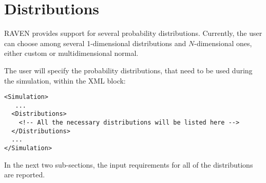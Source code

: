 \section{Distributions}
\label{sec:distributions}
\newcommand{\distname}[1]{\textbf{#1}}
\newcommand{\distattrib}[1]{\textit{#1}}

\newcommand{\nameDescription}{\xmlAttr{name},
  \xmlDesc{required string attribute}, user-defined name of this distribution.
  \nb As with other objects, this identifier can be used to reference this
  specific entity from other input blocks in the XML.}
\newcommand{\specBlock}[2]{The specifications of this distribution must be
  defined within #1 \xmlNode{#2} XML block.}
\newcommand{\attrIntro}{This XML node accepts one attribute:}
\newcommand{\attrsIntro}{This XML node accepts the following attributes:}
\newcommand{\subnodeIntro}{This distribution can be initialized with the
  following child node:}
\newcommand{\subnodesIntro}{This distribution can be initialized with the
  following children nodes:}


RAVEN provides support for several probability distributions.
%
Currently, the user can choose among several 1-dimensional distributions and
$N$-dimensional ones, either custom or multidimensional normal.

The user will specify the probability distributions, that need to be used during
the simulation, within the  XML block:
\begin{lstlisting}[style=XML]
<Simulation>
   ...
  <Distributions>
    <!-- All the necessary distributions will be listed here -->
  </Distributions>
  ...
</Simulation>
\end{lstlisting}

In the next two sub-sections, the input requirements for all of the
distributions are reported.

